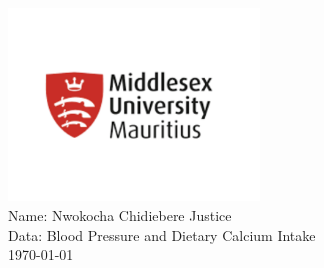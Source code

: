 \begin{titlepage}
\centering
\vspace*{1cm} %
\includegraphics[width=0.5\textwidth]{sch_banner.png}\\[2cm] %
{\large Name: Nwokocha Chidiebere Justice}\\[0.1cm]
{\large Data: Blood Pressure and Dietary Calcium Intake}\\
{\large \today}\\
\vfill
\end{titlepage}
